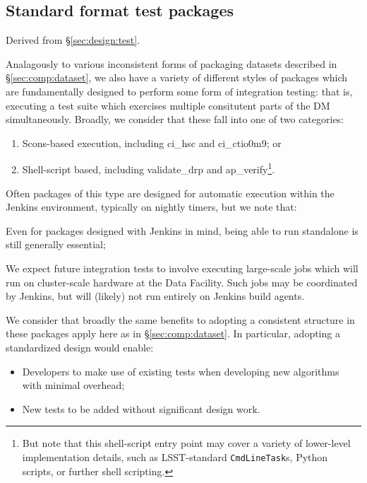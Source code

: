 \subsection{Standard format test packages}
\label{sec:comp:test_pkg}

Derived from \S\ref{sec:design:test}.

Analagously to various inconsistent forms of packaging datasets described in \S\ref{sec:comp:dataset}, we also have a variety of different styles of packages which are fundamentally designed to perform some form of integration testing: that is, executing a test suite which exercises multiple consitutent parts of the DM simultaneously.
Broadly, we consider that these fall into one of two categories:

\begin{enumerate}
    \item{Scons-based execution, including ci\_hsc and ci\_ctio0m9; or}
    \item{Shell-script based, including validate\_drp and ap\_verify\footnote{But note that this shell-script entry point may cover a variety of lower-level implementation details, such as LSST-standard \texttt{CmdLineTask}s, Python scripts, or further shell scripting.}.}
\end{enumerate}

Often packages of this type are designed for automatic execution within the Jenkins environment, typically on nightly timers, but we note that:

\begin{itemize_single}
    \item{Even for packages designed with Jenkins in mind, being able to run standalone is still generally essential;}
    \item{We expect future integration tests to involve executing large-scale jobs which will run on cluster-scale hardware at the Data Facility. Such jobs may be coordinated by Jenkins, but will (likely) not run entirely on Jenkins build agents.}
\end{itemize_single}

We consider that broadly the same benefits to adopting a consistent structure in these packages apply here as in \S\ref{sec:comp:dataset}.
In particular, adopting a standardized design would enable:

\begin{itemize}
    \item{Developers to make use of existing tests when developing new algorithms with minimal overhead;}
    \item{New tests to be added without significant design work.}
\end{itemize}

